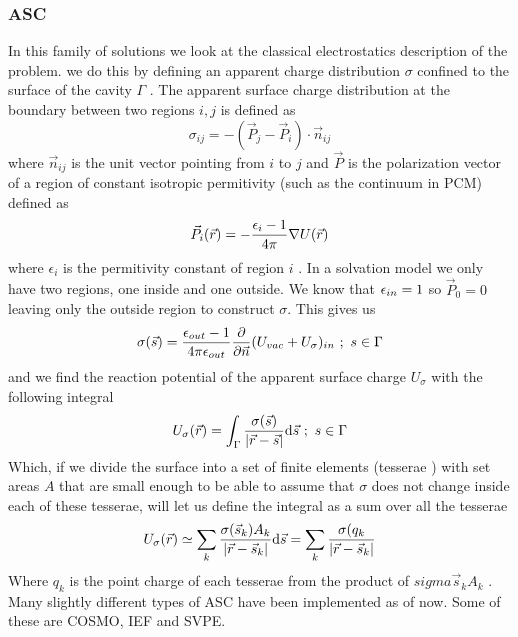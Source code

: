 \documentclass[../master_thesis.tex]{subfiles}
\begin{document}
\subsubsection{ \ac{ASC}}
In this family of solutions we look at the classical electrostatics description
of the problem. we do this by defining an apparent charge distribution
$\sigma$ confined to the surface of the cavity $\Gamma$ \cite{Tomasi:1994wt, Tomasi:2005ipa}.
The apparent surface charge distribution at the boundary between two regions $i, j$
is defined as
\begin{equation}
  \sigma_{ij} = -(\vec{P}_j - \vec{P}_i)\cdot\vec{n}_{ij}
\end{equation}
where $\vec{n}_{ij}$ is the unit vector pointing from $i$ to $j$ and $\vec{P}$ is
the polarization vector of a region of constant isotropic permitivity (such as
the continuum in \ac{PCM}) defined as
\begin{equation}
  \vec{P}_i (\vec{r}) = - \frac{\epsilon_i - 1}{4\pi}\nabla U(\vec{r})
\end{equation}
where $\epsilon_i$ is the permitivity constant of region $i$ \cite{Tomasi:2005ipa}.
In a solvation model we only have two regions, one inside and one outside. We
know that $\epsilon_{in} = 1$ so $\vec{P}_0 = 0$ leaving only the outside region to
construct $\sigma$. This gives us \cite{Tomasi:2005ipa}
\begin{equation}
  \sigma(\vec{s}) =\frac{\epsilon_{out} - 1}{4\pi\epsilon_{out}} \frac{\partial}{\partial\vec{n}} (U_{vac} + U_{\sigma})_{in}\ ;\ s \in \Gamma
\end{equation}
and we find the reaction potential of the apparent surface charge $U_{\sigma}$
with the following integral
 \begin{equation}
   U_{\sigma}(\vec{r}) = \int_{\Gamma}\frac{\sigma(\vec{s})}{\abs{\vec{r} - \vec{s}}} \text{d}\vec{s}\ ;\ s \in \Gamma
 \end{equation}
Which, if we divide the surface into a set of finite elements (tesserae
\cite{Tomasi:2005ipa, Sorland}) with set areas $A$ that are small enough to be able
to assume that $\sigma$ does not change inside each of these tesserae, will let us define the integral
as a sum over all the tesserae
\begin{equation}
   U_{\sigma}(\vec{r}) \simeq \sum_k\frac{\sigma(\vec{s}_k) A_k}{\abs{\vec{r} - \vec{s}_k}} \text{d}\vec{s}
   = \sum_k\frac{\sigma(q_k}{\abs{\vec{r} - \vec{s}_k}}
\end{equation}
Where $q_k$ is the point charge of each tesserae from the product of $sigma{\vec{s}_k}A_k$
\cite{Tomasi:2005ipa}.
Many slightly different types of \ac{ASC} have been implemented as of now. Some of these
are \ac{COSMO}, \ac{IEF} and \ac{SVPE}.
\end{document}
